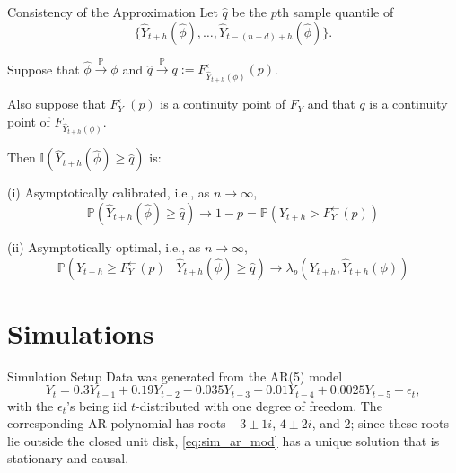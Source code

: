 \documentclass{beamer}
\def\I{\mathbb I}
\def\P{\mathbb P}
\newcommand\Fi[1]{F_{#1}^{\leftarrow}}
\newcommand{\AROptPred}[3]{\hat{Y}_{#1 + #2}(#3)}
\newcommand{\approxAROptPred}[3]{\hat{Y}_{#1 + #2}(\hat{#3})}
\begin{document}
\begin{frame}{Consistency of the Approximation}
    Let $\hat{q}$ be the $p$th sample quantile of
    \[
    \{\approxAROptPred{t}{h}{\phi}, \ldots, \approxAROptPred{t - (n - d)}{h}{\phi}\}.
    \]
    \begin{theorem}
        Suppose that $\hat{\phi} \xrightarrow{\P} \phi$ and $\hat{q} \xrightarrow{\P} q := F_{\AROptPred{t}{h}{\phi}}^{\leftarrow}(p)$.
        
        Also suppose that $\Fi{Y}(p)$ is a continuity point of $F_Y$ and that $q$ is a continuity point of $F_{\AROptPred{t}{h}{\phi}}$.
        
        Then $\I(\approxAROptPred{t}{h}{\phi} \ge \hat{q})$ is:
        
        (i) Asymptotically calibrated, i.e., as $n \to \infty$,
        \[
        \P(\approxAROptPred{t}{h}{\phi} \ge \hat{q}) \to 1 - p = \P(Y_{t + h} > \Fi{Y}(p))
        \]
        
        (ii) Asymptotically optimal, i.e., as $n \to \infty$,
        \[
        \P(Y_{t+h} \ge \Fi{Y}(p) \mid \approxAROptPred{t}{h}{\phi} \ge \hat{q}) \to \lambda_p(Y_{t + h}, \AROptPred{t}{h}{\phi})
        \]
    \end{theorem}
\end{frame}

\section{Simulations}

\begin{frame}{Simulation Setup}
    Data was generated from the AR(5) model
    \begin{equation}\label{eq:sim_ar_mod}
        Y_t = 0.3 Y_{t - 1} + 0.19 Y_{t - 2} - 0.035 Y_{t - 3} - 0.01 Y_{t - 4} + 0.0025 Y_{t - 5} + \epsilon_t,    
    \end{equation}
    with the $\epsilon_t$'s being iid $t$-distributed with one degree of freedom. The corresponding AR polynomial has roots $-3 \pm 1i$, $4 \pm 2i$, and $2$; since these roots lie outside the closed unit disk, \eqref{eq:sim_ar_mod} has a unique solution that is stationary and causal.
\end{frame}
\end{document}
